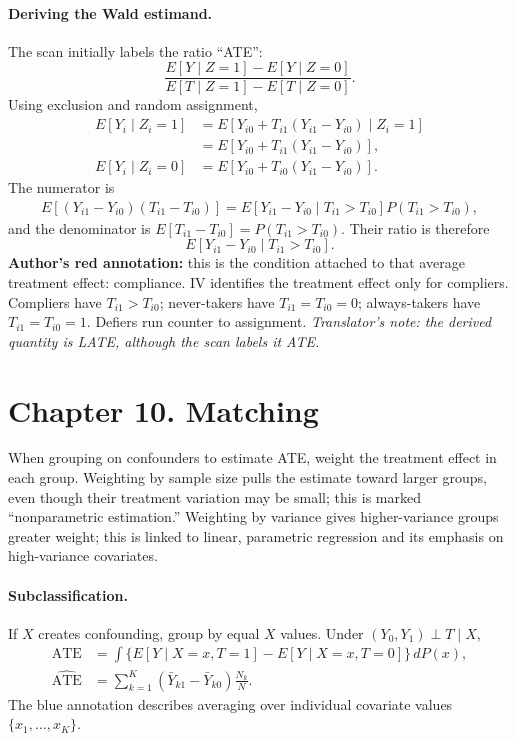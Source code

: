\paragraph{Deriving the Wald estimand.}
The scan initially labels the ratio ``ATE'':
\[\frac{E[Y\mid Z=1]-E[Y\mid Z=0]}{E[T\mid Z=1]-E[T\mid Z=0]}.\]
Using exclusion and random assignment,
\begin{align*}
E[Y_i\mid Z_i=1]&=E[Y_{i0}+T_{i1}(Y_{i1}-Y_{i0})\mid Z_i=1]\\
&=E[Y_{i0}+T_{i1}(Y_{i1}-Y_{i0})],\\
E[Y_i\mid Z_i=0]&=E[Y_{i0}+T_{i0}(Y_{i1}-Y_{i0})].
\end{align*}
The numerator is
\begin{align*}
E[(Y_{i1}-Y_{i0})(T_{i1}-T_{i0})]
=E[Y_{i1}-Y_{i0}\mid T_{i1}>T_{i0}]P(T_{i1}>T_{i0}),
\end{align*}
and the denominator is $E[T_{i1}-T_{i0}]=P(T_{i1}>T_{i0})$. Their ratio is therefore
\[E[Y_{i1}-Y_{i0}\mid T_{i1}>T_{i0}].\]
\textbf{Author's red annotation:} this is the condition attached to that average treatment effect: compliance. IV identifies the treatment effect only for compliers. Compliers have $T_{i1}>T_{i0}$; never-takers have $T_{i1}=T_{i0}=0$; always-takers have $T_{i1}=T_{i0}=1$. Defiers run counter to assignment. \textit{Translator's note: the derived quantity is LATE, although the scan labels it ATE.}

\section{Chapter 10. Matching}
When grouping on confounders to estimate ATE, weight the treatment effect in each group. Weighting by sample size pulls the estimate toward larger groups, even though their treatment variation may be small; this is marked ``nonparametric estimation.'' Weighting by variance gives higher-variance groups greater weight; this is linked to linear, parametric regression and its emphasis on high-variance covariates.

\paragraph{Subclassification.}
If $X$ creates confounding, group by equal $X$ values. Under $(Y_0,Y_1)\perp T\mid X$,
\begin{align*}
\mathrm{ATE}&=\int\{E[Y\mid X=x,T=1]-E[Y\mid X=x,T=0]\}\,dP(x),\\
\widehat{\mathrm{ATE}}&=\sum_{k=1}^{K}(\bar Y_{k1}-\bar Y_{k0})\frac{N_k}{N}.
\end{align*}
The blue annotation describes averaging over individual covariate values $\{x_1,\ldots,x_K\}$.

